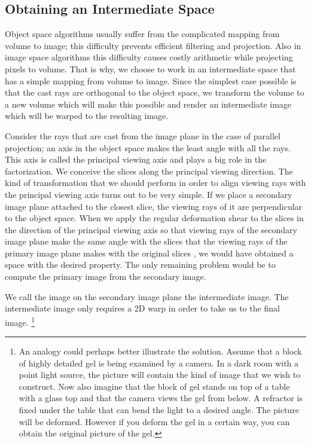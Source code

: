 \documentclass[a4paper,12pt]{article}
\begin{document}
\subsection{Obtaining an Intermediate Space}

Object space algorithms usually suffer from the complicated mapping
from volume to image; this difficulty prevents efficient filtering and
projection. Also in image space algorithms this difficulty causes
costly arithmetic while projecting pixels to volume. That is why, we
choose to work in an intermediate space that has a simple mapping from
volume to image. Since the simplest case possible is that the cast
rays are orthogonal to the object space, we transform the volume to a
new volume which will make this possible and render an intermediate
image which will be warped to the resulting image.

Consider the rays that are cast from the image plane in the case of
parallel projection; an axis in the object space makes the least angle
with all the rays. This axis is called the principal viewing axis and
plays a big role in the factorization. We conceive the slices along
the principal viewing direction. The kind of transformation that we
should perform in order to align viewing rays with the principal
viewing axis turns out to be very simple. If we place a
secondary image plane attached to the closest slice, the viewing rays
of it are perpendicular to the object space. When we apply the regular
deformation shear to the slices in the direction of the principal
viewing axis so that viewing rays of the secondary image plane make
the same angle with the slices that the viewing rays of the primary
image plane makes with the original slices , we would have obtained a space
with the desired property. The only remaining problem would be to
compute the primary image from the secondary image.

We call the image on the secondary image plane the intermediate
image. The intermediate image only requires a 2D warp in order to take
us to the final image.
\footnote{An analogy could perhaps better illustrate the solution. Assume that a
block of highly detailed gel is being examined by a camera.
In a dark room with a point light source, the picture will contain
the kind of image that we wish to
construct. Now also imagine that the block of gel stands on top of a
table with a glass top and that the camera views the gel from below.
A refractor is fixed under the table that can bend the light to
a desired angle. The picture will be deformed. However if you deform
the gel in a certain way, you can obtain the original picture of the
gel.}
\end{document}
